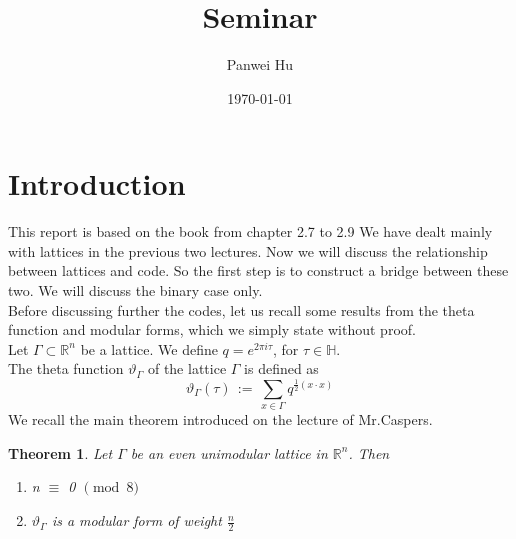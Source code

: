 \documentclass{article}
\title{Seminar}
\date{\today}
\author{Panwei Hu}
\newtheorem{theorem}{Theorem}[section]
\numberwithin{equation}{theorem}
\numberwithin{figure}{theorem}
\newcommand{\thetaFunction}[1]{\ensuremath{\vartheta_{#1}}}
\newcommand{\Real}{\ensuremath{\mathbb{R}}}
\newcommand{\imaginary}{\ensuremath{i}}
\newcommand{\HalfPlane}{\ensuremath{\mathbb{H}}}
\begin{document}
  \maketitle
  \newpage

\tableofcontents
	\newpage
  \newpage
\newpage
\section{Introduction}

This report is based on the book \cite{ebeling2013lattices} from chapter 2.7 to 2.9
We have dealt mainly with lattices in the previous two lectures. Now we will discuss the relationship between lattices and code. So the first step is to construct a bridge between these two. We will discuss the binary case only.\\
Before discussing further the codes, let us recall some results from the theta function and modular forms, which we simply state without proof.\\
Let $\Gamma \subset \Real^n$ be a lattice. We define $q = e^{2\pi\imaginary\tau}$, for $\tau \in \HalfPlane$.\\
The theta function $\thetaFunction{\Gamma}$ of the lattice $\Gamma$ is defined as 
\[
	\thetaFunction{\Gamma}(\tau) \, := \,\sum_{x \in \Gamma} q^{\frac{1}{2}(x\cdot x)} 
\] 
We recall the main theorem introduced on the lecture of Mr.Caspers. 
\begin{theorem}\label{evenUniLattice}
Let $\Gamma$ be an even unimodular lattice in $\Real^n$. Then
\begin{enumerate}
	\item n $\equiv$ 0 $\pmod 8$
	\item {\thetaFunction{\Gamma}} is a modular form of weight $\frac{n}{2}$
\end{enumerate}
\end{theorem}
\end{document}
